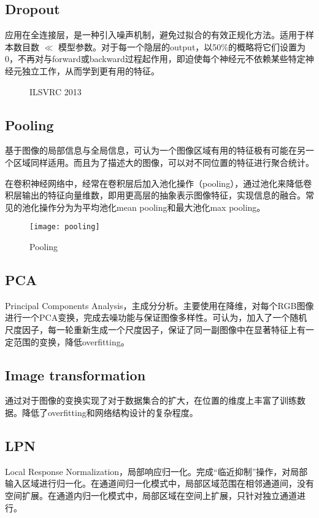 \subsection{Dropout}
应用在全连接层，是一种引入噪声机制，避免过拟合的有效正规化方法。适用于样本数目数 $\ll$ 模型参数。对于每一个隐层的output，以50\%的概略将它们设置为0，不再对与forward或backward过程起作用，即迫使每个神经元不依赖某些特定神经元独立工作，从而学到更有用的特征。
\begin{figure}[!ht]
  \centering 
  \caption{ILSVRC 2013}
\end{figure}


\subsection{Pooling}
基于图像的局部信息与全局信息，可认为一个图像区域有用的特征极有可能在另一个区域同样适用。而且为了描述大的图像，可以对不同位置的特征进行聚合统计。

在卷积神经网络中，经常在卷积层后加入池化操作（pooling），通过池化来降低卷积层输出的特征向量维数，即用更高层的抽象表示图像特征，实现信息的融合。常见的池化操作分为为平均池化mean pooling和最大池化max pooling。
\begin{figure}[!ht]
\centering
\texttt{[image: pooling]}
\caption{Pooling}
\end{figure}

\subsection{PCA}
Principal Components Analysis，主成分分析。主要使用在降维，对每个RGB图像进行一个PCA变换，完成去噪功能与保证图像多样性。可认为，加入了一个随机尺度因子，每一轮重新生成一个尺度因子，保证了同一副图像中在显著特征上有一定范围的变换，降低overfitting。

\subsection{Image transformation}
通过对于图像的变换实现了对于数据集合的扩大，在位置的维度上丰富了训练数据。降低了overfitting和网络结构设计的复杂程度。

\subsection{LPN}
Local Response Normalization，局部响应归一化。完成``临近抑制''操作，对局部输入区域进行归一化。在通道间归一化模式中，局部区域范围在相邻通道间，没有空间扩展。在通道内归一化模式中，局部区域在空间上扩展，只针对独立通道进行。

